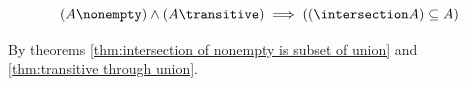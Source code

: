 \begin{theorem}{}
\[
(A\nonempty)
\land
(A\transitive) 
\implies
 \left(\left(\intersection A\right)\subseteq A\right)
\]
\end{theorem}
\Proof
By theorems \ref{thm:intersection of nonempty is subset of union} and \ref{thm:transitive through union}.\\
\Done


